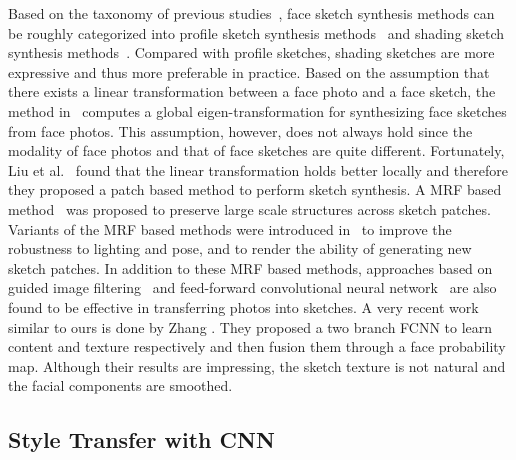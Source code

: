 \documentclass[10pt,twocolumn,letterpaper]{article}
\begin{document}
Based on the taxonomy of previous studies~\cite{song2014real,zhou2012markov}, face sketch synthesis methods can be roughly categorized into profile sketch synthesis methods~\cite{berger2013style,chen2001example,xu2008hierarchical} and shading sketch synthesis methods~\cite{liu2005nonlinear,song2014real,tang2003face,wang2009face,zhang2015end,zhang2010lighting,zhou2012markov}. Compared with profile sketches, shading sketches are more expressive and thus more preferable in practice. Based on the assumption that there exists a linear transformation between a face photo and a face sketch, the method in~\cite{tang2003face} computes a global eigen-transformation for synthesizing face sketches from face photos. This assumption, however, does not always hold since the modality of face photos and that of face sketches are quite different. Fortunately, Liu et al.~\cite{liu2005nonlinear} found that the linear transformation holds better locally and therefore they proposed a patch based method to perform sketch synthesis. A MRF based method~\cite{wang2009face} was proposed to preserve large scale structures across sketch patches. Variants of the MRF based methods were introduced in~\cite{zhang2010lighting,zhou2012markov} to improve the robustness to lighting and pose, and to render the ability of generating new sketch patches. In addition to these MRF based methods, approaches based on guided image filtering~\cite{song2014real} and feed-forward convolutional neural network~\cite{zhang2015end} are also found to be effective in transferring photos into sketches. A very recent work similar to ours is done by Zhang \etal \cite{zhang2017content}. They proposed a two branch FCNN to learn content and texture respectively and then fusion them through a face probability map. Although their results are impressing, the sketch texture is not natural and the facial components are smoothed.

\subsection{Style Transfer with CNN}
\end{document}
